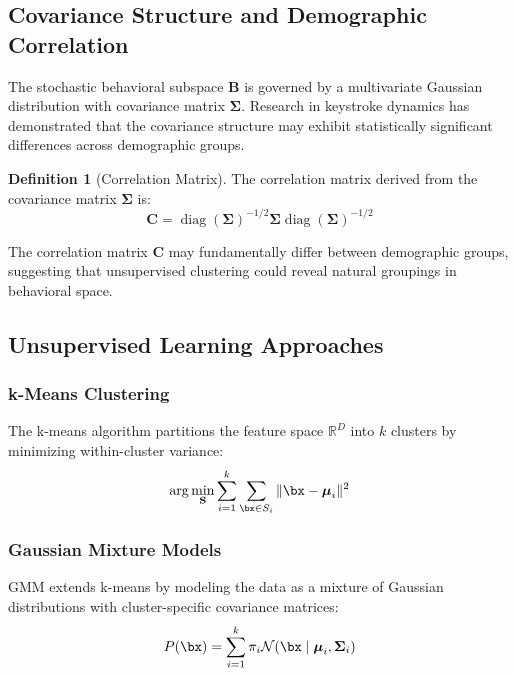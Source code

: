 \documentclass[11pt,twoside]{amsart}
\theoremstyle{plain}
\theoremstyle{definition}
\newtheorem{definition}[theorem]{Definition}
\theoremstyle{remark}
\DeclareMathOperator{\diag}{diag}
\newcommand{\bB}{\mathbf{B}}
\newcommand{\bSigma}{\boldsymbol{\Sigma}}
\newcommand{\bmu}{\boldsymbol{\mu}}
\newcommand{\calN}{\mathcal{N}}
\newcommand{\bbR}{\mathbb{R}}
\begin{document}
\subsection{Covariance Structure and Demographic Correlation}

The stochastic behavioral subspace $\bB$ is governed by a multivariate Gaussian distribution with covariance matrix $\bSigma$. Research in keystroke dynamics has demonstrated that the covariance structure may exhibit statistically significant differences across demographic groups.

\begin{definition}[Correlation Matrix]
\label{def:correlation}
The correlation matrix derived from the covariance matrix $\bSigma$ is:
\begin{equation}
\mathbf{C} = \diag(\bSigma)^{-1/2} \bSigma \diag(\bSigma)^{-1/2}
\end{equation}
\end{definition}

The correlation matrix $\mathbf{C}$ may fundamentally differ between demographic groups, suggesting that unsupervised clustering could reveal natural groupings in behavioral space.

\subsection{Unsupervised Learning Approaches}

\subsubsection{k-Means Clustering}

The k-means algorithm partitions the feature space $\bbR^D$ into $k$ clusters by minimizing within-cluster variance:
\begin{equation}
\arg\min_{\mathbf{S}} \sum_{i=1}^{k} \sum_{\bx \in S_i} \|\bx - \bmu_i\|^2
\end{equation}

\subsubsection{Gaussian Mixture Models}

GMM extends k-means by modeling the data as a mixture of Gaussian distributions with cluster-specific covariance matrices:
\begin{equation}
P(\bx) = \sum_{i=1}^{k} \pi_i \calN(\bx \mid \bmu_i, \bSigma_i)
\end{equation}
\end{document}
